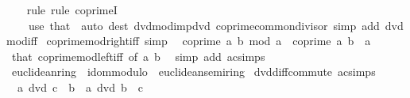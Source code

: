 \begin{isabellebody}
%
\isadelimproof
\ \ %
\endisadelimproof
%
\isatagproof
{}\isamarkupfalse%
\ {\isacharparenleft}{\kern0pt}rule{\isacharsemicolon}{\kern0pt}\ rule\ coprimeI{\isacharparenright}{\kern0pt}\isanewline
\ \ \ \ {\isacharparenleft}{\kern0pt}use\ that\ \ {\isacartoucheopen}auto\ dest{\isacharbang}{\kern0pt}{\isacharcolon}{\kern0pt}\ dvd{\isacharunderscore}{\kern0pt}mod{\isacharunderscore}{\kern0pt}imp{\isacharunderscore}{\kern0pt}dvd\ coprime{\isacharunderscore}{\kern0pt}common{\isacharunderscore}{\kern0pt}divisor\ simp\ add{\isacharcolon}{\kern0pt}\ dvd{\isacharunderscore}{\kern0pt}mod{\isacharunderscore}{\kern0pt}iff{\isacartoucheclose}{\isacharparenright}{\kern0pt}%
\endisatagproof
{\isafoldproof}%
%
\isadelimproof
\isanewline
%
\endisadelimproof
\isanewline
{}\isamarkupfalse%
\ coprime{\isacharunderscore}{\kern0pt}mod{\isacharunderscore}{\kern0pt}right{\isacharunderscore}{\kern0pt}iff\ {\isacharbrackleft}{\kern0pt}simp{\isacharbrackright}{\kern0pt}{\isacharcolon}{\kern0pt}\isanewline
\ \ {\isachardoublequoteopen}coprime\ a\ {\isacharparenleft}{\kern0pt}b\ mod\ a{\isacharparenright}{\kern0pt}\ {\isasymlongleftrightarrow}\ coprime\ a\ b{\isachardoublequoteclose}\ \ {\isachardoublequoteopen}a\ {\isasymnoteq}\ {}{\isachardoublequoteclose}\isanewline
%
\isadelimproof
\ \ %
\endisadelimproof
%
\isatagproof
{}\isamarkupfalse%
\ that\ coprime{\isacharunderscore}{\kern0pt}mod{\isacharunderscore}{\kern0pt}left{\isacharunderscore}{\kern0pt}iff\ {\isacharbrackleft}{\kern0pt}of\ a\ b{\isacharbrackright}{\kern0pt}\ \isamarkupfalse%
\ {\isacharparenleft}{\kern0pt}simp\ add{\isacharcolon}{\kern0pt}\ ac{\isacharunderscore}{\kern0pt}simps{\isacharparenright}{\kern0pt}%
\endisatagproof
{\isafoldproof}%
%
\isadelimproof
\isanewline
%
\endisadelimproof
\isanewline
{}\isamarkupfalse%
\isanewline
\isanewline
{}\isamarkupfalse%
\ euclidean{\isacharunderscore}{\kern0pt}ring\ {\isacharequal}{\kern0pt}\ idom{\isacharunderscore}{\kern0pt}modulo\ {\isacharplus}{\kern0pt}\ euclidean{\isacharunderscore}{\kern0pt}semiring\isanewline
{}\isanewline
\isanewline
{}\isamarkupfalse%
\ dvd{\isacharunderscore}{\kern0pt}diff{\isacharunderscore}{\kern0pt}commute\ {\isacharbrackleft}{\kern0pt}ac{\isacharunderscore}{\kern0pt}simps{\isacharbrackright}{\kern0pt}{\isacharcolon}{\kern0pt}\isanewline
\ \ {\isachardoublequoteopen}a\ dvd\ c\ {\isacharminus}{\kern0pt}\ b\ {\isasymlongleftrightarrow}\ a\ dvd\ b\ {\isacharminus}{\kern0pt}\ c{\isachardoublequoteclose}\isanewline

\end{isabellebody}
